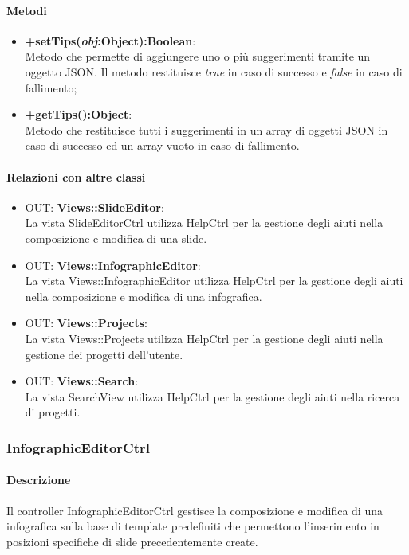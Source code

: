 	\paragraph{Metodi}
	\begin{itemize}
	  \item \textbf{+setTips(\textit{obj}:Object):Boolean}:\\
		  Metodo che permette di aggiungere uno o più suggerimenti tramite un oggetto JSON. Il metodo restituisce \textit{true} in caso di successo e \textit{false} in caso di fallimento;
	  \item \textbf{+getTips():Object}:\\
		  Metodo che restituisce tutti i suggerimenti in un array di oggetti JSON in caso di successo ed un array vuoto in caso di fallimento.
	\end{itemize}
	\paragraph{Relazioni con altre classi}
	\begin{itemize}
	 \item OUT: \textbf{Views::SlideEditor}:\\
		La vista SlideEditorCtrl utilizza HelpCtrl per la gestione degli aiuti nella composizione e modifica di una slide.
	 \item OUT: \textbf{Views::InfographicEditor}:\\
		La vista Views::InfographicEditor utilizza HelpCtrl per la gestione degli aiuti nella composizione e modifica di una infografica.
	 \item OUT: \textbf{Views::Projects}:\\
		La vista Views::Projects utilizza HelpCtrl per la gestione degli aiuti nella gestione dei progetti dell'utente.
	 \item OUT: \textbf{Views::Search}:\\
		La vista SearchView utilizza HelpCtrl per la gestione degli aiuti nella ricerca di progetti.
	\end{itemize}

\newpage
\subsubsection{InfographicEditorCtrl}
	\paragraph{Descrizione}
		Il controller InfographicEditorCtrl gestisce la composizione e modifica di una infografica sulla base di template predefiniti che permettono l'inserimento in posizioni specifiche di slide precedentemente create.
	
